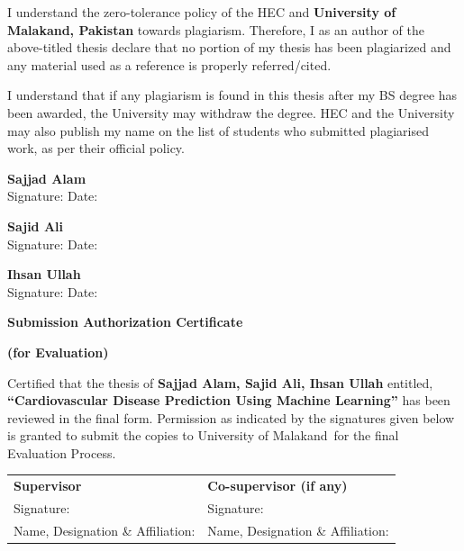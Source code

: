 \documentclass[12pt, a4paper, oneside]{book}
\newcommand{\thesistitle}{Cardiovascular Disease Prediction Using Machine Learning}
\newcommand{\thesisauthorA}{Sajjad Alam}
\newcommand{\thesisauthorB}{Sajid Ali}
\newcommand{\thesisauthorC}{Ihsan Ullah}
\newcommand{\thesisuni}{University of Malakand}
\begin{document}
\noindent I understand the zero-tolerance policy of the HEC and \textbf{\thesisuni, Pakistan} towards plagiarism. Therefore, I as an author of the above-titled thesis declare that no portion of my thesis has been plagiarized and any material used as a reference is properly referred/cited.

\noindent I understand that if any plagiarism is found in this thesis after my BS degree has been awarded, the University may withdraw the degree. HEC and the University may also publish my name on the list of students who submitted plagiarised work, as per their official policy.
\vspace{1.2in}

\noindent \textbf{\thesisauthorA}\\
Signature: \hrulefill \quad Date: \hrulefill

\vspace{0.3in}
\noindent \textbf{\thesisauthorB}\\
Signature: \hrulefill \quad Date: \hrulefill

\vspace{0.3in}
\noindent \textbf{\thesisauthorC}\\
Signature: \hrulefill \quad Date: \hrulefill

\clearpage
\thispagestyle{plain}
\vspace*{0.5cm}
\begin{center}
{\fontsize{14pt}{16pt}\selectfont \textbf{Submission Authorization Certificate}\par}
\vspace{0.05in}
\vspace{0.2in}
{\fontsize{14pt}{16pt}\selectfont \textbf{(for Evaluation)}\par}
\end{center}
\vspace{0.4in}

\noindent Certified that the thesis of \textbf{\thesisauthorA, \thesisauthorB, \thesisauthorC} entitled, \textbf{``\thesistitle''} has been reviewed in the final form. Permission as indicated by the signatures given below is granted to submit the copies to \thesisuni\ for the final Evaluation Process.

\vspace{0.8in}

\noindent
\begin{tabular}{@{}p{}p{}@{}}
\textbf{Supervisor} & \textbf{Co-supervisor (if any)} \\
Signature: \hrulefill & Signature: \hrulefill \\
Name, Designation \& Affiliation: \hrulefill & Name, Designation \& Affiliation: \hrulefill
\end{tabular}
\end{document}
